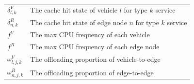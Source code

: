 \documentclass[lettersize,journal]{IEEEtran}
\begin{document}
\begin{table}
\begin{center}
\begin{tabularx}{\linewidth}{p{1.8cm} X}
	$ \delta^{V}_{l,k}  $			&	The cache hit state of vehicle $ l$ for type $ k $ service		\\	
	$ \delta^{R}_{n,k} $				& The cache hit state of edge node $ n $ for type $ k $ service 		\\
	$ f^{V}$					&	The max CPU frequency of each vehicle 	\\	
	$ f^{R} $					&  The max CPU frequency of each edge node\\
	$ \omega^{V}_{l,j,k}$			&	The offloading proportion of vehicle-to-edge	\\	
	$ \omega^{R}_{n,j,k}$			&	The offloading proportion of edge-to-edge\\	
	\hline
	\end{tabularx}
	\end{center}
\end{table}
\end{document}
